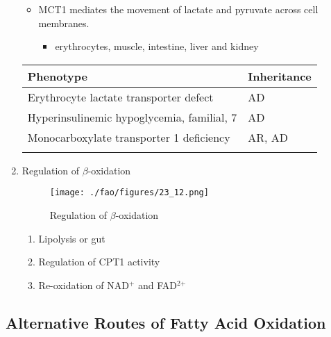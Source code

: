 \documentclass{scrartcl}
\begin{document}
\begin{enumerate}
\begin{itemize}
\item MCT1 mediates the movement of lactate and pyruvate across cell
membranes.
\begin{itemize}
\item erythrocytes, muscle, intestine, liver and kidney
\end{itemize}
\end{itemize}

\begin{center}
\begin{tabular}{ll}
Phenotype & Inheritance\\
\hline
Erythrocyte lactate transporter defect & AD\\
Hyperinsulinemic hypoglycemia, familial, 7\footnotemark & AD\\
Monocarboxylate transporter 1 deficiency & AR, AD\\
 & \\
\end{tabular}
\end{center}


\item Regulation of \(\beta\)-oxidation
\label{sec:org1e980c0}
\begin{figure}[htbp]
\centering
\texttt{[image: ./fao/figures/23\_12.png]}
\caption{\label{fig:org15f5a92}
Regulation of \(\beta\)-oxidation}
\end{figure}

\begin{enumerate}
\item Lipolysis or gut
\item Regulation of CPT1 activity
\item Re-oxidation of NAD\(^{\text{+}}\) and FAD\(^{\text{2+}}\)
\end{enumerate}
\end{enumerate}

\subsection{Alternative Routes of Fatty Acid Oxidation}
\label{sec:org6e703bb}
\end{document}

